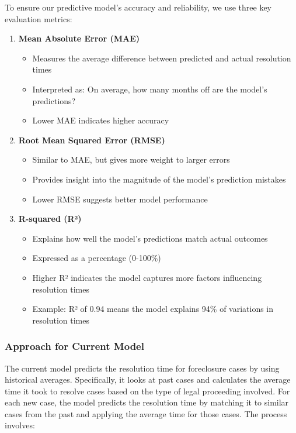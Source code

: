 \documentclass[
  letterpaper,
  DIV=11,
  numbers=noendperiod]{scrartcl}
\providecommand{\tightlist}{%
  \setlength{\itemsep}{0pt}\setlength{\parskip}{0pt}}\usepackage{longtable,booktabs,array}
\begin{document}
To ensure our predictive model's accuracy and reliability, we use three
key evaluation metrics:

\begin{enumerate}
\def\labelenumi{\arabic{enumi}.}
\tightlist
\item
  \textbf{Mean Absolute Error (MAE)}

  \begin{itemize}
  \tightlist
  \item
    Measures the average difference between predicted and actual
    resolution times
  \item
    Interpreted as: On average, how many months off are the model's
    predictions?
  \item
    Lower MAE indicates higher accuracy
  \end{itemize}
\item
  \textbf{Root Mean Squared Error (RMSE)}

  \begin{itemize}
  \tightlist
  \item
    Similar to MAE, but gives more weight to larger errors
  \item
    Provides insight into the magnitude of the model's prediction
    mistakes
  \item
    Lower RMSE suggests better model performance
  \end{itemize}
\item
  \textbf{R-squared (R²)}

  \begin{itemize}
  \tightlist
  \item
    Explains how well the model's predictions match actual outcomes
  \item
    Expressed as a percentage (0-100\%)
  \item
    Higher R² indicates the model captures more factors influencing
    resolution times
  \item
    Example: R² of 0.94 means the model explains 94\% of variations in
    resolution times
  \end{itemize}
\end{enumerate}

\subsubsection{Approach for Current Model}\label{sec-current-model}

The current model predicts the resolution time for foreclosure cases by
using historical averages. Specifically, it looks at past cases and
calculates the average time it took to resolve cases based on the type
of legal proceeding involved. For each new case, the model predicts the
resolution time by matching it to similar cases from the past and
applying the average time for those cases. The process involves:
\end{document}
